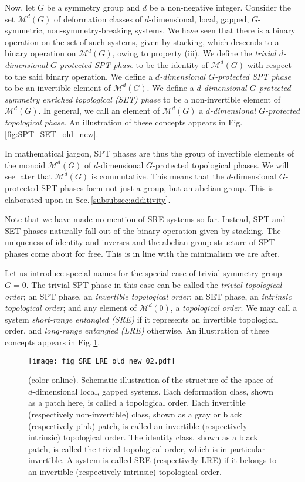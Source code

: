 \documentclass[sort&compress]{elsarticle}
\theoremstyle{theoremstyle}
\theoremstyle{framedtheoremstyle}
\theoremstyle{definitionstyle}
\theoremstyle{definitionstyle}
\theoremstyle{definitionstyle}
\theoremstyle{definitionstyle}
\theoremstyle{nameddefinitionstyle}
\theoremstyle{framednameddefinitionstyle}
\theoremstyle{proofstyle}
\theoremstyle{definitionstyle}
\newcommand{\M}{\mathcal{M}}
\begin{document}
Now, let $G$ be a symmetry group and $d$ be a non-negative integer. Consider the set $\M^d(G)$ of deformation classes of $d$-dimensional, local, gapped, $G$-symmetric, non-symmetry-breaking systems. We have seen that there is a binary operation on the set of such systems, given by stacking, which descends to a binary operation on $\M^d(G)$, owing to property (iii). We define the \emph{trivial $d$-dimensional $G$-protected SPT phase} to be the identity of $\M^d(G)$ with respect to the said binary operation. We define a \emph{$d$-dimensional $G$-protected SPT phase} to be an invertible element of $\M^d(G)$. We define a \emph{$d$-dimensional $G$-protected symmetry enriched topological (SET) phase} to be a non-invertible element of $\M^d(G)$. In general, we call an element of $\M^d(G)$ a \emph{$d$-dimensional $G$-protected topological phase}. An illustration of these concepts appears in Fig.\,\ref{fig:SPT_SET_old_new}.

In mathematical jargon, SPT phases are thus the group of invertible elements of the monoid $\M^d(G)$ of $d$-dimensional $G$-protected topological phases. We will see later that $\M^d(G)$ is commutative. This means that the $d$-dimensional $G$-protected SPT phases form not just a group, but an abelian group. This is elaborated upon in Sec.\,\ref{subsubsec:additivity}.

Note that we have made no mention of SRE systems so far. Instead, SPT and SET phases naturally fall out of the binary operation given by stacking. The uniqueness of identity and inverses and the abelian group structure of SPT phases come about for free. This is in line with the minimalism we are after.

Let us introduce special names for the special case of trivial symmetry group $G=0$. The trivial SPT phase in this case can be called the \emph{trivial topological order}; an SPT phase, an \emph{invertible topological order}; an SET phase, an \emph{intrinsic topological order}; and any element of $\M^d(0)$, a \emph{topological order}. We may call a system \emph{short-range entangled (SRE)} if it represents an invertible topological order, and \emph{long-range entangled (LRE)} otherwise. An illustration of these concepts appears in Fig.\,\ref{fig:SRE_LRE_old_new}.

\begin{figure}[t]
\centering
\texttt{[image: fig\_SRE\_LRE\_old\_new\_02.pdf]}
\caption{(color online). Schematic illustration of the structure of the space of $d$-dimensional local, gapped systems. Each deformation class, shown as a patch here, is called a topological order. Each invertible (respectively non-invertible) class, shown as a gray or black (respectively pink) patch, is called an invertible (respectively intrinsic) topological order. The identity class, shown as a black patch, is called the trivial topological order, which is in particular invertible. A system is called SRE (respectively LRE) if it belongs to an invertible (respectively intrinsic) topological order.}
\label{fig:SRE_LRE_old_new}
\end{figure}
\end{document}
